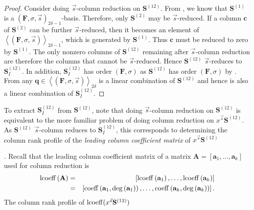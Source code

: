 \begin{proof}
Consider doing $\vec{s}$-column reduction on $\mathbf{S}^{\left(12\right)}$.
From , we know that $\mathbf{S}^{\left(1\right)}$
is a $\left(\mathbf{F},\sigma,\vec{s}\right)_{2\delta-1}$-basis.
Therefore, only $\mathbf{S}^{\left(2\right)}$ may be $\vec{s}$-reduced.
If a column $\mathbf{c}$ of $\mathbf{S}^{\left(2\right)}$ can be
further $\vec{s}$-reduced, then it becomes an element of $\left\langle \left(\mathbf{F},\sigma,\vec{s}\right)\right\rangle _{2\delta-1}$,
which is generated by $\mathbf{S}^{\left(1\right)}$. Thus $\mathbf{c}$
must be reduced to zero by $\mathbf{S}^{\left(1\right)}$. The only
nonzero columns of $\mathbf{S}^{\left(12\right)}$ remaining after
$\vec{s}$-column reduction are therefore the columns that cannot
be $\vec{s}$-reduced. Hence $\mathbf{S}^{\left(12\right)}$ $\vec{s}$-reduces
to \textbf{$\mathbf{S}_{I}^{\left(12\right)}$}. In addition, \textbf{$\mathbf{S}_{I}^{\left(12\right)}$}
has order $\left(\mathbf{F},\sigma\right)$ as $\mathbf{S}^{\left(12\right)}$
has order $\left(\mathbf{F},\sigma\right)$ by .
From  any $\mathbf{q}\in\left\langle \left(\mathbf{F},\sigma,\vec{s}\right)\right\rangle _{2\delta}$
is a linear combination of $\mathbf{S}^{\left(12\right)}$ and hence
is also a linear combination of $\mathbf{S}_{I}^{\left(12\right)}$. 
\end{proof}
To extract $\mathbf{S}_{I}^{\left(12\right)}$ from $\mathbf{S}^{\left(12\right)}$,
note that doing $\vec{s}$-column reduction on $\mathbf{S}^{\left(12\right)}$
is equivalent to the more familiar problem of doing column reduction
on $x^{\vec{s}}\mathbf{S}^{\left(12\right)}$. As $\mathbf{S}^{\left(12\right)}$
$\vec{s}$-column reduces to \textbf{$\mathbf{S}_{I}^{\left(12\right)}$},
this corresponds to determining the column rank profile of the\emph{
leading column coefficient matrix }of\emph{ }\textbf{$x^{\vec{s}}\mathbf{S}^{\left(12\right)}$}%
\begin{comment}
\emph{ }$S^{\left(12\right)}=\lcoeff(x^{\vec{s}}\cdot\mathbf{S}^{\left(12\right)})$ 
\end{comment}
\emph{. }Recall that the leading column coefficient matrix of a matrix
$\mathbf{A}=\left[\mathbf{a}_{1},\dots,\mathbf{a}_{k}\right]$ used
for column reduction is\emph{ 
\begin{eqnarray*}
\operatorname{lcoeff}\left(\mathbf{A}\right) & = & \left[\operatorname{lcoeff}\left(\mathbf{a}_{1}\right),\dots,\operatorname{lcoeff}\left(\mathbf{a}_{k}\right)\right]\\
 & = & \left[\operatorname{coeff}\left(\mathbf{a}_{1},\deg\left(\mathbf{a}_{1}\right)\right),\dots,\operatorname{coeff}\left(\mathbf{a}_{k},\deg\left(\mathbf{a}_{k}\right)\right)\right].
\end{eqnarray*}
 }The column rank profile of $\operatorname{lcoeff}(x^{\vec{s}}\mathbf{S}^{\left(12\right)})$
